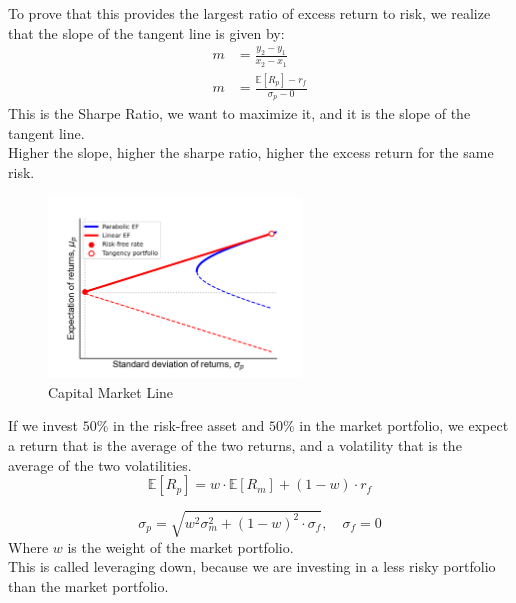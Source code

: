 \begin{definition}
    To prove that this provides the largest ratio of excess return to risk, we realize that the slope of the tangent line is given by:
    \begin{align*}
        m & = \frac{y_2 - y_1}{x_2 - x_1}                \\
        m & = \frac{\mathbb{E}[R_p] - r_f}{\sigma_p - 0}
    \end{align*}
    This is the Sharpe Ratio, we want to maximize it, and it is the slope of the tangent line.\\
    Higher the slope, higher the sharpe ratio, higher the excess return for the same risk.
\end{definition}

\begin{figure}[h!]
    \centering
    \includegraphics[width=0.6\textwidth]{LECTURE_4/CML.png}
    \caption{Capital Market Line}
    \label{fig:capital_market_line}

\end{figure}

\begin{proposition}
    If we invest $50\%$ in the risk-free asset and $50\%$ in the market portfolio, we expect a return that is the average of the two returns, and a volatility that is the average of the two volatilities.\\
    \begin{equation}
        \mathbb{E}[R_{p}] = w\cdot \mathbb{E}[R_{m}] + (1-w)\cdot r_f
    \end{equation}

    \begin{equation}
        \sigma_{p} = \sqrt{w^2 \sigma_{m}^2 + (1-w)^2 \cdot \sigma_{f}}, \quad \sigma_{f} = 0
    \end{equation}
    Where $w$ is the weight of the market portfolio.\\
    This is called leveraging down, because we are investing in a less risky portfolio than the market portfolio.\\
\end{proposition}

